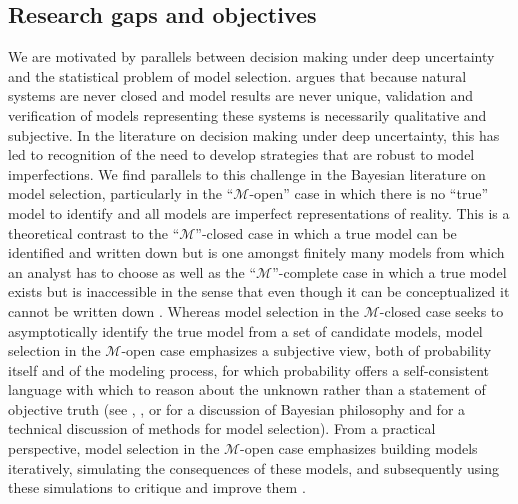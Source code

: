 \documentclass[11pt]{article}
\begin{document}
\subsection{Research gaps and objectives}

We are motivated by parallels between decision making under deep uncertainty and the statistical problem of model selection.
\citet{oreskes_verification:1994} argues that because natural systems are never closed and model results are never unique, validation and verification of models representing these systems is necessarily qualitative and subjective.
In the literature on decision making under deep uncertainty, this has led to recognition of the need to develop strategies that are robust to model imperfections.
We find parallels to this challenge in the Bayesian literature on model selection, particularly in the ``$\mathcal{M}$-open'' case in which there is no ``true'' model to identify and all models are imperfect representations of reality.
This is a theoretical contrast to the ``$\mathcal{M}$''-closed case in which a true model can be identified and written down but is one amongst finitely many models from which an analyst has to choose as well as the ``$\mathcal{M}$''-complete case in which a true model exists but is inaccessible in the sense that even though it can be conceptualized it cannot be written down \citep{bernardo_bayesian:1994}.
Whereas model selection in the $\mathcal{M}$-closed case seeks to asymptotically identify the true model from a set of candidate models, model selection in the $\mathcal{M}$-open case emphasizes a subjective view, both of probability itself and of the modeling process, for which probability offers a self-consistent language with which to reason about the unknown rather than a statement of objective truth (see \cite{gelman_philosophy:2013}, \cite{ramsey_probability:2016}, or \cite{jaynes_probability:2003} for a discussion of Bayesian philosophy and \cite{Piironen:2017eh} for a technical discussion of methods for model selection).
From a practical perspective, model selection in the $\mathcal{M}$-open case emphasizes building models iteratively, simulating the consequences of these models, and subsequently using these simulations to critique and improve them \citep{gelman_workflow:2020}.
\end{document}
